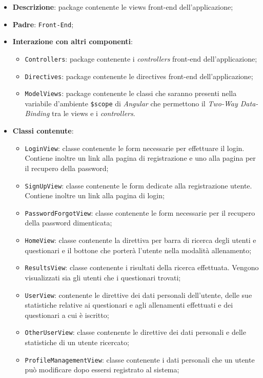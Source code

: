 \begin{itemize}
	\item \textbf{Descrizione}: package contenente le views front-end dell'applicazione;
	\item \textbf{Padre}: \texttt{Front-End};
	\item \textbf{Interazione con altri componenti}:
	\begin{itemize}
		\item \texttt{Controllers}: package contenente i \textit{controllers} front-end dell'applicazione;
		\item \texttt{Directives}: package contenente le directives front-end dell'applicazione;
		\item \texttt{ModelViews}: package contenente le classi che saranno presenti nella variabile d'ambiente \texttt{\$scope} di \textit{Angular} che permettono il \textit{Two-Way Data-Binding} tra le views e i \textit{controllers}.
	\end{itemize}
	\item \textbf{Classi contenute}:
	\begin{itemize}
		\item \texttt{LoginView}: classe contenente le form necessarie per effettuare il login. Contiene inoltre un link alla pagina di registrazione e uno alla pagina per il recupero della password;
		\item \texttt{SignUpView}: classe contenente le form dedicate alla registrazione utente. Contiene inoltre un link alla pagina di login;
		\item \texttt{PasswordForgotView}: classe contenente le form necessarie per il recupero della password dimenticata;
		\item \texttt{HomeView}: classe contenente la direttiva per barra di ricerca degli utenti e questionari e il bottone che porterà l'utente nella modalità allenamento;
		\item \texttt{ResultsView}: classe contenente i risultati della ricerca effettuata. Vengono visualizzati sia gli utenti che i questionari trovati;
		\item \texttt{UserView}: contenente le direttive dei dati personali dell'utente, delle sue statistiche relative ai questionari e agli allenamenti effettuati e dei questionari a cui è iscritto;
		\item \texttt{OtherUserView}: classe contenente le direttive dei dati personali e delle statistiche di un utente ricercato;
		\item \texttt{ProfileManagementView}: classe contenente i dati personali che un utente può modificare dopo essersi registrato al sistema;

\end{itemize}
\end{itemize}
